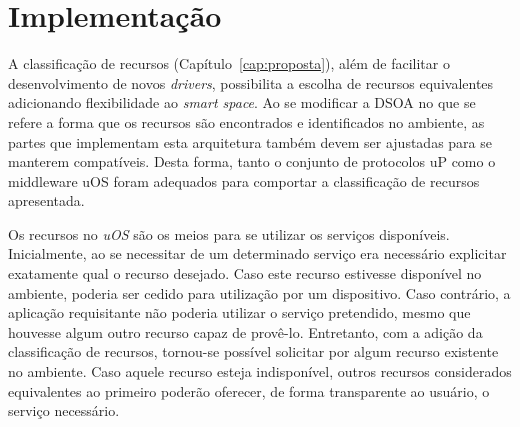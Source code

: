 \chapter{Implementação}

A classificação de recursos (Capítulo~\ref{cap:proposta}), além de facilitar o desenvolvimento de novos \emph{drivers}, possibilita a escolha de recursos equivalentes adicionando flexibilidade ao \emph{smart space}. Ao se modificar a DSOA no que se refere a forma que os recursos são encontrados e identificados no ambiente, as partes que implementam esta arquitetura também devem ser ajustadas para se manterem compatíveis. Desta forma, tanto o conjunto de protocolos uP como o middleware uOS foram adequados para comportar a classificação de recursos apresentada.

Os recursos no \emph{uOS} são os meios para se utilizar os serviços disponíveis. Inicialmente, ao se necessitar de um determinado serviço era necessário explicitar exatamente qual o recurso desejado. Caso este recurso estivesse disponível no ambiente, poderia ser cedido para utilização por um dispositivo. Caso contrário, a aplicação requisitante não poderia utilizar o serviço pretendido, mesmo que houvesse algum outro recurso capaz de provê-lo. Entretanto, com a adição da classificação de recursos, tornou-se possível solicitar por algum recurso existente no ambiente. Caso aquele recurso esteja indisponível, outros recursos considerados equivalentes ao primeiro poderão oferecer, de forma transparente ao usuário, o serviço necessário.


